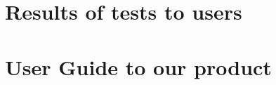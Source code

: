 \chapter{Results of tests to users}\label{ap:user_tests}

\chapter{User Guide to our product}\label{ap:guide}

